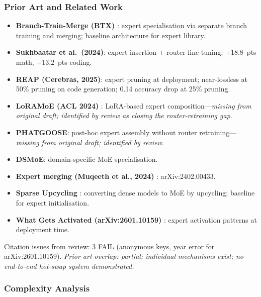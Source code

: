 \documentclass[11pt]{article}
\begin{document}
\subsubsection*{Prior Art and Related Work}
\begin{itemize}
  \item \textbf{Branch-Train-Merge (BTX)} \cite{BTXRef}: expert specialisation via separate branch training and merging; baseline architecture for expert library.

  \item \textbf{Sukhbaatar et al.\ (2024)}: expert insertion + router fine-tuning; $+18.8$~pts math, $+13.2$~pts coding.

  \item \textbf{REAP (Cerebras, 2025)}: expert pruning at deployment; near-lossless at 50\% pruning on code generation; 0.14 accuracy drop at 25\% pruning.

  \item \textbf{LoRAMoE (ACL 2024)} \cite{LoRAMoERef}: LoRA-based expert composition---\emph{missing from original draft; identified by review as closing the router-retraining gap}.

  \item \textbf{PHATGOOSE}: post-hoc expert assembly without router retraining---\emph{missing from original draft; identified by review}.

  \item \textbf{DSMoE}: domain-specific MoE specialisation.

  \item \textbf{Expert merging (Muqeeth et al., 2024)} \cite{MuqeethEtAl2024}: arXiv:2402.00433.

  \item \textbf{Sparse Upcycling} \cite{KomatsuzakiEtAl2022}: converting dense models to MoE by upcycling; baseline for expert initialisation.

  \item \textbf{What Gets Activated (arXiv:2601.10159)} \cite{WhatGetsActivated2026}: expert activation patterns at deployment time.
\end{itemize}

\noindent
Citation issues from review: 3 FAIL (anonymous keys, year error for arXiv:2601.10159).
\emph{Prior art overlap: partial; individual mechanisms exist; no end-to-end hot-swap system demonstrated.}

\subsubsection*{Complexity Analysis}
\end{document}
